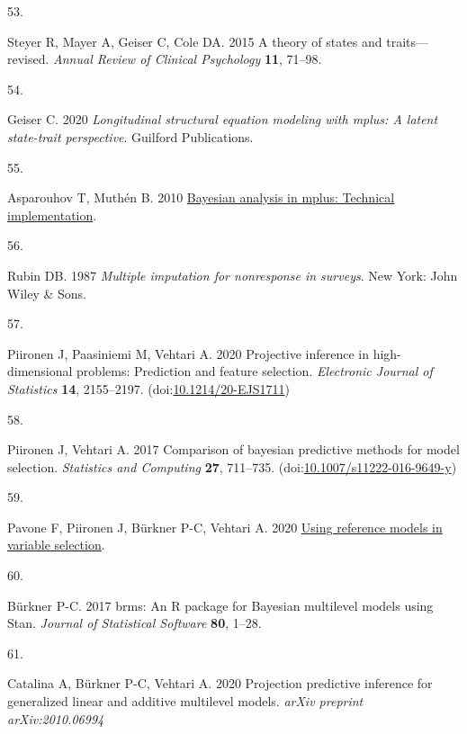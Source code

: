 \documentclass[
  man,floatsintext]{apa6}
\newlength{\cslhangindent}
\newlength{\csllabelwidth}
\newenvironment{CSLReferences}[2] %
 {\begin{list}{}{%
  \setlength{\itemindent}{0pt}
  \setlength{\leftmargin}{0pt}
  \setlength{\parsep}{0pt}
  \ifodd #1
   \setlength{\leftmargin}{\cslhangindent}
   \setlength{\itemindent}{-1\cslhangindent}
  \fi
  \setlength{\itemsep}{#2\baselineskip}}}
 {\end{list}}
\newcommand{\CSLLeftMargin}[1]{\parbox[t]{\csllabelwidth}{\strut#1\strut}}
\newcommand{\CSLRightInline}[1]{\parbox[t]{\linewidth - \csllabelwidth}{\strut#1\strut}}
\begin{document}
\begin{CSLReferences}{0}{1}
\CSLLeftMargin{53. }%
\CSLRightInline{Steyer R, Mayer A, Geiser C, Cole DA. 2015 A theory of states and traits---revised. \emph{Annual Review of Clinical Psychology} \textbf{11}, 71--98.}

\CSLLeftMargin{54. }%
\CSLRightInline{Geiser C. 2020 \emph{Longitudinal structural equation modeling with mplus: A latent state-trait perspective}. Guilford Publications. }

\CSLLeftMargin{55. }%
\CSLRightInline{Asparouhov T, Muthén B. 2010 \href{http://www.statmodel.com/download/Bayes3.pdf}{Bayesian analysis in mplus: Technical implementation}. }

\CSLLeftMargin{56. }%
\CSLRightInline{Rubin DB. 1987 \emph{Multiple imputation for nonresponse in surveys}. New York: John Wiley \& Sons. }

\CSLLeftMargin{57. }%
\CSLRightInline{Piironen J, Paasiniemi M, Vehtari A. 2020 {Projective inference in high-dimensional problems: Prediction and feature selection}. \emph{Electronic Journal of Statistics} \textbf{14}, 2155--2197. (doi:\href{https://doi.org/10.1214/20-EJS1711}{10.1214/20-EJS1711})}

\CSLLeftMargin{58. }%
\CSLRightInline{Piironen J, Vehtari A. 2017 Comparison of bayesian predictive methods for model selection. \emph{Statistics and Computing} \textbf{27}, 711--735. (doi:\href{https://doi.org/10.1007/s11222-016-9649-y}{10.1007/s11222-016-9649-y})}

\CSLLeftMargin{59. }%
\CSLRightInline{Pavone F, Piironen J, Bürkner P-C, Vehtari A. 2020 \href{https://arxiv.org/abs/2004.13118}{Using reference models in variable selection}. }

\CSLLeftMargin{60. }%
\CSLRightInline{Bürkner P-C. 2017 {brms}: An {R} package for {Bayesian} multilevel models using {Stan}. \emph{Journal of Statistical Software} \textbf{80}, 1--28.}

\CSLLeftMargin{61. }%
\CSLRightInline{Catalina A, Bürkner P-C, Vehtari A. 2020 Projection predictive inference for generalized linear and additive multilevel models. \emph{arXiv preprint arXiv:2010.06994} }


\end{CSLReferences}
\end{document}
